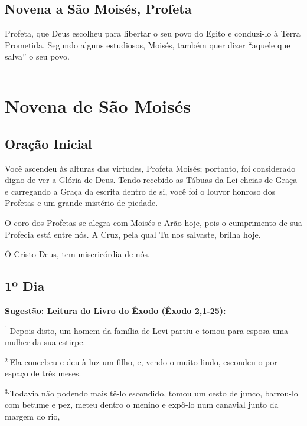 \documentclass[a4paper,14pt]{extarticle} \usepackage[utf8]{inputenc}
\begin{document}
\subsection*{Novena a São Moisés, Profeta}
Profeta, que Deus escolheu para libertar o seu povo do Egito e conduzi-lo à Terra Prometida. Segundo alguns estudiosos, Moisés, também quer dizer “aquele que salva” o seu povo.

\par\noindent\rule{\textwidth}{0.4pt}

\tableofcontents
\thispagestyle{empty}

\newpage



\newpage

\section{Novena de São Moisés}

\subsection{Oração Inicial}
Você ascendeu às alturas das virtudes, Profeta Moisés; portanto, foi considerado digno de ver a Glória de Deus. Tendo recebido as Tábuas da Lei cheias de Graça e carregando a Graça da escrita dentro de si, você foi o louvor honroso dos Profetas e um grande mistério de piedade.

O coro dos Profetas se alegra com Moisés e Arão hoje, pois o cumprimento de sua Profecia está entre nós. A Cruz, pela qual Tu nos salvaste, brilha hoje. 

Ó Cristo Deus, tem misericórdia de nós.



\subsection{1º Dia}
\textbf{Sugestão: Leitura do Livro do Êxodo (Êxodo 2,1-25):}

$^{1. }$Depois disto, um homem da família de Levi partiu e tomou para esposa uma mulher da sua estirpe.

$^{2. }$Ela concebeu e deu à luz um filho, e, vendo-o muito lindo, escondeu-o por espaço de três meses.

$^{3. }$Todavia não podendo mais tê-lo escondido, tomou um cesto de junco, barrou-lo com betume e pez, meteu dentro o menino e expô-lo num canavial junto da margem do rio,
\end{document}
